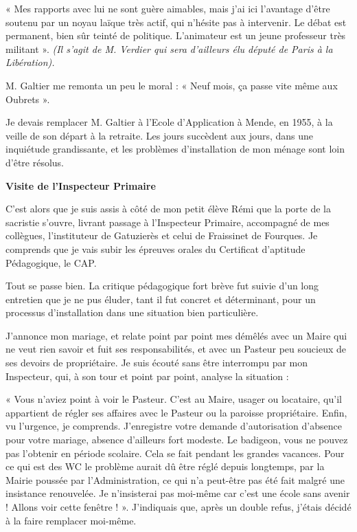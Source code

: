 « Mes rapports avec lui ne sont guère aimables, mais j’ai ici l’avantage d’être soutenu par un
noyau laïque très actif, qui n’hésite pas à intervenir. Le débat est permanent, bien sûr teinté de
politique. L’animateur est un jeune professeur très militant ». \textit{(Il s’agit de M. Verdier qui sera
d’ailleurs élu député de Paris à la Libération).}

M. Galtier me remonta un peu le moral :
« Neuf mois, ça passe vite même aux Oubrets ».


Je devais remplacer M. Galtier à l’Ecole d’Application à Mende, en 1955, à la veille de son
départ à la retraite. Les jours succèdent aux jours, dans une inquiétude grandissante, et les
problèmes d’installation de mon ménage sont loin d’être résolus.

\textbf{Visite de l’Inspecteur Primaire}

C’est alors que je suis assis à côté de mon petit élève Rémi que la porte de la sacristie s’ouvre,
livrant passage à l’Inspecteur Primaire, accompagné de mes collègues, l’instituteur de
Gatuzierès et celui de Fraissinet de Fourques. Je comprends que je vais subir les épreuves
orales du Certificat d’aptitude Pédagogique, le CAP.

Tout se passe bien. La critique pédagogique fort brève fut suivie d’un long entretien que je ne
pus éluder, tant il fut concret et déterminant, pour un processus d’installation dans une
situation bien particulière.

J’annonce mon mariage, et relate point par point mes démêlés avec un Maire qui ne veut rien
savoir et fuit ses responsabilités, et avec un Pasteur peu soucieux de ses devoirs de
propriétaire.
Je suis écouté sans être interrompu par mon Inspecteur, qui, à son tour et point par point,
analyse la situation :

« Vous n’aviez point à voir le Pasteur. C’est au Maire, usager ou locataire, qu’il appartient de
régler ses affaires avec le Pasteur ou la paroisse propriétaire. Enfin, vu l’urgence, je
comprends.
J’enregistre votre demande d’autorisation d’absence pour votre mariage, absence d’ailleurs
fort modeste. Le badigeon, vous ne pouvez pas l’obtenir en période scolaire. Cela se fait
pendant les grandes vacances. Pour ce qui est des WC le problème aurait dû être réglé depuis
longtemps, par la Mairie poussée par l’Administration, ce qui n’a peut-être pas été fait malgré
une insistance renouvelée. Je n’insisterai pas moi-même car c’est une école sans
avenir ! Allons voir cette fenêtre ! ».
J’indiquais que, après un double refus, j’étais décidé à la faire remplacer moi-même.

